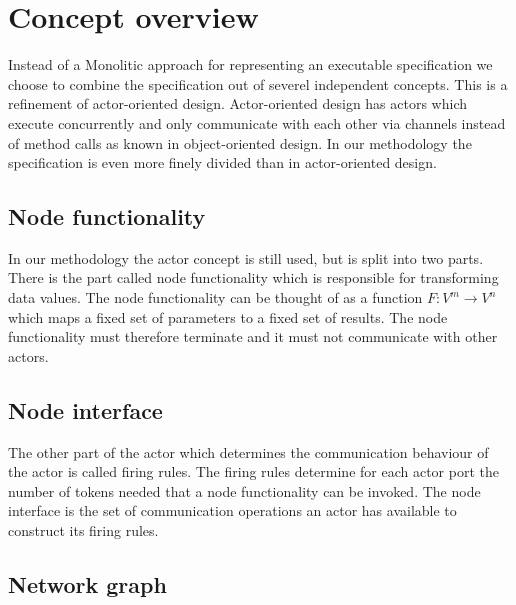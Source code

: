 \section{Concept overview}
\label{concept-overview}

Instead of a Monolitic approach for representing an executable specification
we choose to combine the specification out of  severel independent concepts.
This is a refinement of actor-oriented design. Actor-oriented design has actors which execute
concurrently and only communicate with each other via channels instead
of method calls as known in object-oriented design. In our
methodology the specification is even more finely divided than in
actor-oriented design.

\subsection{Node functionality}

In our methodology the actor concept is still used, but is split into two parts.
There is the part called node functionality which is responsible
for transforming data values. The node functionality can be
thought of as a function $F: V^{m} \to V^{n}$  which maps a fixed set
of parameters to a fixed set of results. The node functionality must
therefore terminate and it must not communicate with
other actors.

\subsection{Node interface}

The other part of the actor which determines the communication
behaviour of the actor is called firing rules. The firing rules
determine for each actor port the number of tokens needed
that a node functionality can be invoked.
The node interface is the set of communication operations an
actor has available to construct its firing rules.

\subsection{Network graph}

